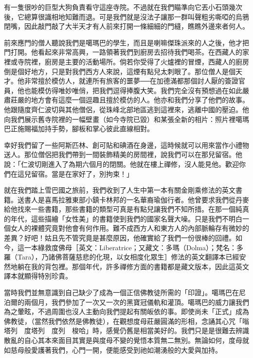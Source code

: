 有一隻很吵的巨型大狗負責看守這座寺院。不過就在我們瞄準向它丟小石頭幾次後，它總算很識相地知難而退。可是我們就是沒法子讓那一群叫聲粗劣嘶啞的烏鴉閉嘴，因此敲門敲了大半天才有人前來打開一條細細的門縫，瞧瞧外邊來者何人。

前來應門的僧人聽說我們是噶瑪巴的學生，而且是喇嘛傑珠派來的人之後，他才把門打開。他看起來非常高興，一路領著我們到廚房去招待我們喝茶。在西藏人的家裡或寺院裡，廚房是主要的活動場所。倘若你受得了火爐裡的冒煙，西藏人的廚房倒是個好地方，只是對我們西方人來說，這煙有點兒太刺眼了。那位僧人是個天才。他非常擅於模仿人，就連所有旅客的噩夢──在加德滿都那個討人厭的簽證官員，他也能模仿得唯妙唯俏，把我們逗得捧腹大笑。我們完全沒有預想過在如此嚴肅莊嚴的地方會有這麼一個逗趣且擅於模仿的人。他亦和我們分享了他們的故事。他跟隨度齊仁波切與其他僧侶，從珠峰北部地區逃到這裡來，逃離中國的壓迫。他向我們展示舊寺院裡的一幅壁畫（如今寺院已毀）和某張全新的相片：照片裡噶瑪巴正施賜福加持手勢，腳板和掌心彼此直線相對。

幸好我們留了一些阿斯匹林、創可貼和碘酒在身邊，這時候就可以用來當作小禮物送人。那位僧侶把我們帶到一間裝飾精美的房間裡，說我們可以在那兒留宿。他說：「仁波切剛進入了為期六個月的閉關。他就在樓上禪修，沒人能見他。歡迎你們在這兒留宿。當是在家好了，別拘束！」

就在我們踏上雪巴國之旅前，我們收到了人生中第一本有關金剛乘修法的英文書籍。送書人是喜馬拉雅東部小鎮卡林邦的一名華裔瑜伽行者。他曾要求我們從丹麥給他找來一些書籍，那些書籍的類型可真是有點兒讓我們不知所措。在那一個純真的年代，這些描繪「女性美」的書籍使到我們的國家名聲大噪。只是我們不明白一個女人的裸體究竟對他會有何作用。難不成西方人和東方人的內部脈輪存有微妙的差異？好吧！姑且先不管究竟是甚麼原因，他確實給了我們一份很棒的回禮。如今，這一本綠救度佛母［英文：Liberatrice；又藏文：多瑪（Dolma）；梵名：多羅（Tara），乃諸佛菩薩慈悲的化現，以女相度化眾生］修法的英文翻譯本已經安然地躺在我的背包裡。那個年代，許多禪修方面的書籍都是藏文版本，因此這英文譯本就顯得特別珍貴。

當時我們並無意識到自己缺少了成為一個正信佛教徒所需的「印證」。噶瑪巴在尼泊爾的兩個月，我們參加了一次又一次的黑寶冠儀軌和灌頂。噶瑪巴的威力讓我們為之暈眩，不過周圍也沒人主動向我們提起有關皈依的事。即使尚未「正式」成為佛教徒，（當然我們依然是佛教徒），在觀想度母莊嚴圓滿的形相，念誦其心咒「嗡　塔列　度塔列　度列　梭哈」時，感覺仍舊是相當美好的。我們只是是很難去辨識散亂的自心其本來面目其實是與度母不變的覺悟本質無二無別。無論如何，度母就如慈母般愛護著我們，心門一開，便能感受到祂如潮湧般的大愛與加持。

